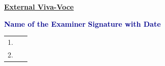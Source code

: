 \vspace{0.15cm}

\begin{center}
\textcolor{VTURed}{\underline{\textbf{External Viva-Voce}}}
\end{center}

\vspace{0.15cm}

\noindent
\textcolor{DarkBlue}{\textbf{Name of the Examiner}}
\hfill
\textcolor{DarkBlue}{\textbf{Signature with Date}}

\vspace{0.35cm}

\begin{tabular}{p{10cm}p{5cm}}

1.\ \dotfill & \dotfill \\[0.5cm]

2.\ \dotfill & \dotfill \\

\end{tabular}